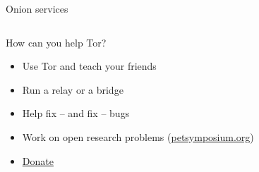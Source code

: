 \documentclass[aspectratio=169,10pt]{beamer}
\begin{document}
\begin{frame}[fragile]{Onion services}
\begin{columns}
\begin{column}{0.5\textwidth}
\begin{center}
\begin{overlayarea}{\textwidth}{0.5\textheight}
          \end{overlayarea}
        \end{center}
      \end{column}
    \end{columns}
  \end{frame}
  
  
  \begin{frame}[fragile]{How can you help Tor?}
    \begin{itemize}
      \item Use \alert{Tor} and teach your friends
      \item Run a \alert{relay} or a \alert{bridge}
      \item Help fix -- and fix -- bugs
      \item Work on open research problems (\href{https://petsymposium.org/}{petsymposium.org})
      \item \href{https://donate.torproject.org/pdr}{Donate}
    \end{itemize}
  \end{frame}
  
\end{document}
